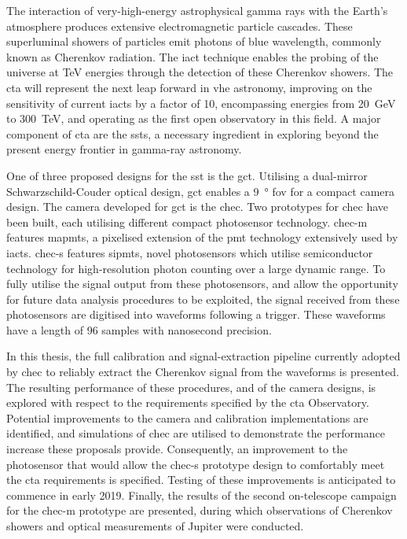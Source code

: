 The interaction of very-high-energy astrophysical gamma rays with the Earth's atmosphere produces extensive electromagnetic particle cascades. These superluminal showers of particles emit photons of blue wavelength, commonly known as Cherenkov radiation. The \gls{iact} technique enables the probing of the universe at \si{TeV} energies through the detection of these Cherenkov showers. The \gls{cta} will represent the next leap forward in \gls{vhe} astronomy, improving on the sensitivity of current \glspl{iact} by a factor of 10, encompassing energies from \SI{20}{GeV} to \SI{300}{TeV}, and operating as the first open observatory in this field. A major component of \gls{cta} are the \glspl{sst}, a necessary ingredient in exploring beyond the present energy frontier in gamma-ray astronomy.

One of three proposed designs for the \gls{sst} is the \gls{gct}. Utilising a dual-mirror Schwarzschild-Couder optical design, \gls{gct} enables a \SI{9}{\degree} \gls{fov} for a compact camera design. The camera developed for \gls{gct} is the \gls{chec}. Two prototypes for \gls{chec} have been built, each utilising different compact photosensor technology. \gls{chec-m} features \glspl{mapmt}, a pixelised extension of the \gls{pmt} technology extensively used by \glspl{iact}. \mbox{\gls{chec-s}} features \glspl{sipmt}, novel photosensors which utilise semiconductor technology for high-resolution photon counting over a large dynamic range. To fully utilise the signal output from these photosensors, and allow the opportunity for future data analysis procedures to be exploited, the signal received from these photosensors are digitised into waveforms following a trigger. These waveforms have a length of 96 samples with nanosecond precision.

In this thesis, the full calibration and signal-extraction pipeline currently adopted by \gls{chec} to reliably extract the Cherenkov signal from the waveforms is presented. The resulting performance of these procedures, and of the camera designs, is explored with respect to the requirements specified by the \gls{cta} Observatory. Potential improvements to the camera and calibration implementations are identified, and simulations of \gls{chec} are utilised to demonstrate the performance increase these proposals provide. Consequently, an improvement to the photosensor that would allow the \gls{chec-s} prototype design to comfortably meet the \gls{cta} requirements is specified. Testing of these improvements is anticipated to commence in early 2019. Finally, the results of the second on-telescope campaign for the \gls{chec-m} prototype are presented, during which observations of Cherenkov showers and optical measurements of Jupiter were conducted.